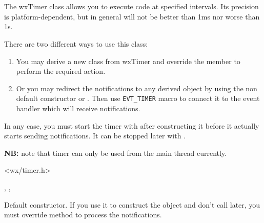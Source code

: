 \section{}\label{wxtimer}

The wxTimer class allows you to execute code at specified intervals. Its
precision is platform-dependent, but in general will not be better than 1ms nor
worse than 1s.

There are two different ways to use this class:

\begin{enumerate}
\item You may derive a new class from wxTimer and override the 
 member to perform the required action.
\item Or you may redirect the notifications to any 
 derived object by using the non default
constructor or . Then use {\tt EVT\_TIMER} 
macro to connect it to the event handler which will receive 
 notifications.
\end{enumerate}

In any case, you must start the timer with  
after constructing it before it actually starts sending notifications. It can
be stopped later with .

{\bf NB:} note that timer can only be used from the main thread currently.




<wx/timer.h>


, , 


\label{wxtimerwxtimer}


Default constructor. If you use it to construct the object and don't call 
 later, you must override 
 method to process the notifications.


